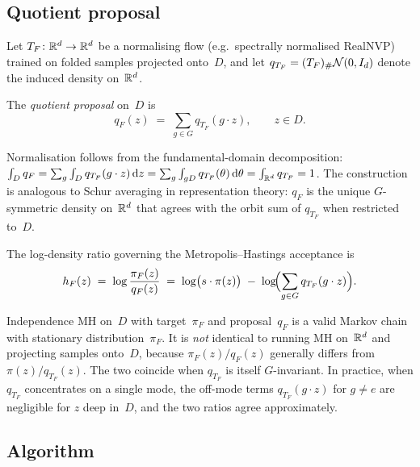 \subsection{Quotient proposal}
\label{sec:quotient_proposal}

Let $T_F\colon \mathbb{R}^d \to \mathbb{R}^d$ be a normalising flow
(e.g.\ spectrally normalised RealNVP) trained on folded samples
projected onto~$D$, and let
$q_{T_F} = (T_F)_{\#}\mathcal{N}(0, I_d)$ denote the induced density
on~$\mathbb{R}^d$.

\begin{definition}\label{def:quotient_proposal}
  The \emph{quotient proposal} on~$D$ is
  \begin{equation}\label{eq:q_F}
    q_F(z) \;=\; \sum_{g \in G} q_{T_F}(g \cdot z), \qquad z \in D.
  \end{equation}
\end{definition}

\noindent
Normalisation follows from the fundamental-domain decomposition:
$\int_D q_F = \sum_g \int_D q_{T_F}(g \cdot z)\,\mathrm{d}z
= \sum_g \int_{gD} q_{T_F}(\theta)\,\mathrm{d}\theta
= \int_{\mathbb{R}^d} q_{T_F} = 1$.
The construction is analogous to Schur averaging in representation
theory: $q_F$ is the unique $G$-symmetric density on~$\mathbb{R}^d$
that agrees with the orbit sum of $q_{T_F}$ when restricted to~$D$.

The log-density ratio governing the Metropolis--Hastings
acceptance is
\begin{equation}\label{eq:h_F}
  h_F(z)
  \;=\; \log\frac{\pi_F(z)}{q_F(z)}
  \;=\; \log\bigl(s \cdot \pi(z)\bigr)
  \;-\; \log\!\Bigl(\sum_{g \in G} q_{T_F}(g \cdot z)\Bigr).
\end{equation}

\begin{remark}\label{rem:not_equivalent}
  Independence MH on~$D$ with target~$\pi_F$ and proposal~$q_F$ is
  a valid Markov chain with stationary distribution~$\pi_F$.  It is
  \emph{not} identical to running MH on~$\mathbb{R}^d$ and projecting
  samples onto~$D$, because $\pi_F(z)/q_F(z)$ generally differs from
  $\pi(z)/q_{T_F}(z)$.  The two coincide when $q_{T_F}$ is itself
  $G$-invariant.  In practice, when $q_{T_F}$ concentrates on a single
  mode, the off-mode terms $q_{T_F}(g \cdot z)$ for $g \neq e$ are
  negligible for $z$ deep in~$D$, and the two ratios agree
  approximately.
\end{remark}


\subsection{Algorithm}
\label{sec:algorithm}

